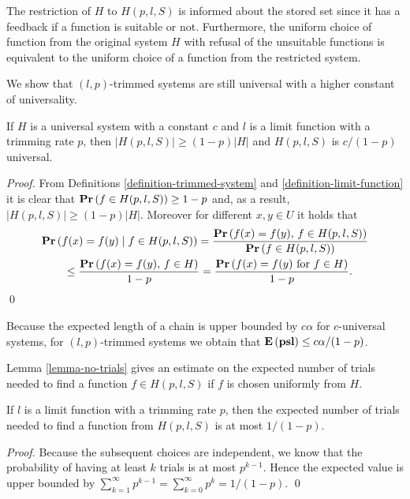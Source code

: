 The restriction of $H$ to $H(p, l, S)$ is informed about the stored set since it has a feedback if a function is suitable or not. 
Furthermore, the uniform choice of function from the original system $H$ with refusal of the unsuitable functions is equivalent to the uniform choice of a function from the restricted system.

We show that $(l, p)$-trimmed systems are still universal with a higher constant of universality. 
\begin{lemma}
\label{lemma-trimmed-system}
If $H$ is a universal system with a constant $c$ and $l$ is a limit function with a trimming rate $p$, then $|H(p, l, S)| \geq (1 - p)|H|$ and $H(p, l, S)$ is $c/(1 - p)$ universal.
\end{lemma}
\begin{proof}
From Definitions \ref{definition-trimmed-system} and \ref{definition-limit-function} it is clear that $\mathbf{Pr}\left(f \in H(p, l, S)\right) \geq 1 - p$ and, as a result, $|H(p, l, S)| \geq (1 - p)|H|$.
Moreover for different $x, y \in U$ it holds that
\[
\begin{split}
& \mathbf{Pr}\left(f(x) = f(y) \mid f \in H(p, l, S)\right) 
	= \frac{\mathbf{Pr}\left(f(x) = f(y),\, f \in H(p, l, S)\right)}{\mathbf{Pr}\left(f \in H(p, l, S)\right)} \\
	& \qquad \leq \frac{\mathbf{Pr}\left(f(x) = f(y),\, f \in H\right)}{1 - p} = \frac{\mathbf{Pr}\left(f(x) = f(y) \mbox{ for } f \in H\right)}{1 - p}. \\
\end{split}
\]
\qed
\end{proof}

Because the expected length of a chain is upper bounded by $c\alpha$ for $c$-universal systems, for $(l, p)$-trimmed systems we obtain that $\mathbf{E}\left(\mathbf{psl}\right) \leq c\alpha/(1-p)$.

Lemma \ref{lemma-no-trials} gives an estimate on the expected number of trials needed to find a function $f \in H(p, l, S)$ if $f$ is chosen uniformly from $H$.
\begin{lemma}
\label{lemma-no-trials}
If $l$ is a limit function with a trimming rate $p$, then the expected number of trials needed to find a function from $H(p, l, S)$ is at most ${1}/{(1 - p)}$.
\end{lemma}
\begin{proof}
Because the subsequent choices are independent, we know that the probability of having at least $k$ trials is at most $p^{k - 1}$. Hence the expected value is upper bounded by $\sum_{k = 1}^{\infty} p^{k - 1} = \sum_{k = 0}^{\infty} p^k = {1}/{(1 - p)}.$
\qed
\end{proof}

